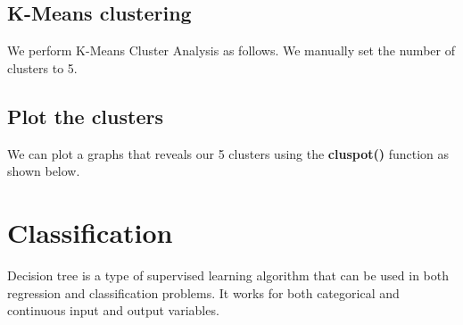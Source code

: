 \documentclass[
]{article}
\newenvironment{Shaded}{\begin{snugshade}}{\end{snugshade}}
\newcommand{\AttributeTok}[1]{\textcolor[rgb]{0.77,0.63,0.00}{#1}}
\newcommand{\CommentTok}[1]{\textcolor[rgb]{0.56,0.35,0.01}{\textit{#1}}}
\newcommand{\ConstantTok}[1]{\textcolor[rgb]{0.00,0.00,0.00}{#1}}
\newcommand{\DecValTok}[1]{\textcolor[rgb]{0.00,0.00,0.81}{#1}}
\newcommand{\FunctionTok}[1]{\textcolor[rgb]{0.00,0.00,0.00}{#1}}
\newcommand{\NormalTok}[1]{#1}
\newcommand{\OtherTok}[1]{\textcolor[rgb]{0.56,0.35,0.01}{#1}}
\newcommand{\SpecialCharTok}[1]{\textcolor[rgb]{0.00,0.00,0.00}{#1}}
\newcommand{\StringTok}[1]{\textcolor[rgb]{0.31,0.60,0.02}{#1}}
\begin{document}
\hypertarget{k-means-clustering}{%
\subsection{K-Means clustering}\label{k-means-clustering}}

We perform K-Means Cluster Analysis as follows. We manually set the
number of clusters to 5.

\begin{Shaded}
\end{Shaded}

\hypertarget{plot-the-clusters}{%
\subsection{Plot the clusters}\label{plot-the-clusters}}

We can plot a graphs that reveals our 5 clusters using the
\textbf{cluspot()} function as shown below.

\begin{Shaded}
\end{Shaded}

\hypertarget{classification}{%
\section{Classification}\label{classification}}

Decision tree is a type of supervised learning algorithm that can be
used in both regression and classification problems. It works for both
categorical and continuous input and output variables.
\end{document}
